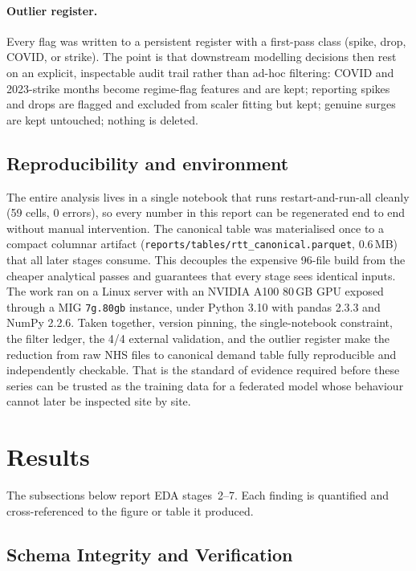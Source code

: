 \documentclass[11pt,a4paper]{article}
\begin{document}
\paragraph{Outlier register.} Every flag was written to a persistent register with a first-pass class (spike, drop, COVID, or strike). The point is that downstream modelling decisions then rest on an explicit, inspectable audit trail rather than ad-hoc filtering: COVID and 2023-strike months become regime-flag features and are kept; reporting spikes and drops are flagged and excluded from scaler fitting but kept; genuine surges are kept untouched; nothing is deleted.

\subsection{Reproducibility and environment}
The entire analysis lives in a single notebook that runs restart-and-run-all cleanly (59 cells, 0 errors), so every number in this report can be regenerated end to end without manual intervention. The canonical table was materialised once to a compact columnar artifact (\texttt{reports/\allowbreak tables/\allowbreak rtt\_canonical.parquet}, 0.6\,MB) that all later stages consume. This decouples the expensive 96-file build from the cheaper analytical passes and guarantees that every stage sees identical inputs. The work ran on a Linux server with an NVIDIA A100 80\,GB GPU exposed through a MIG \texttt{7g.80gb} instance, under Python 3.10 with pandas 2.3.3 and NumPy 2.2.6. Taken together, version pinning, the single-notebook constraint, the filter ledger, the 4/4 external validation, and the outlier register make the reduction from raw NHS files to canonical demand table fully reproducible and independently checkable. That is the standard of evidence required before these series can be trusted as the training data for a federated model whose behaviour cannot later be inspected site by site.

\section{Results}\label{sec:results}
The subsections below report EDA stages~2--7. Each finding is quantified and cross-referenced to the figure or table it produced.

\subsection{Schema Integrity and Verification}\label{sec:schema}
\end{document}
